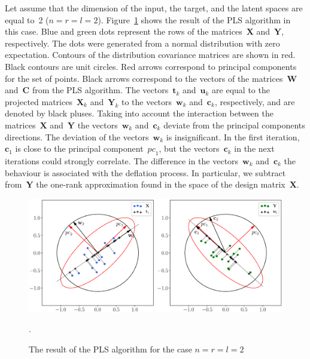 \documentclass[12pt,oneside]{article}
\theoremstyle{definition}
\newcommand{\bw}{\mathbf{w}}
\newcommand{\bY}{\mathbf{Y}}
\newcommand{\bX}{\mathbf{X}}
\newcommand{\bu}{\mathbf{u}}
\newcommand{\bt}{\mathbf{t}}
\newcommand{\bc}{\mathbf{c}}
\newcommand{\bC}{\mathbf{C}}
\newcommand{\bW}{\mathbf{W}}
\begin{document}
Let assume that the dimension of the input, the target, and the latent spaces are equal to~2 ($n = r = l = 2$).
Figure~\ref{fig:PLSFigure} shows the result of the PLS algorithm in this case.
Blue and green dots represent the rows of the matrices~$\bX$ and~$\bY$, respectively. 
The dots were generated from a normal distribution with zero expectation. 
Contours of the distribution covariance matrices are shown in red.
Black contours are unit circles. 
Red arrows correspond to principal components for the set of points. 
Black arrows correspond to the vectors of the matrices~$\bW$ and~$\bC$ from the PLS algorithm. 
The vectors~$\bt_k$ and~$\bu_k$ are equal to the projected matrices~$\bX_k$ and~$\bY_k$ to the vectors~$\bw_k$ and~$\bc_k$, respectively, and are denoted by black pluses. 
Taking into account the interaction between the matrices~$\bX$ and~$\bY$ the vectors~$\bw_k$ and~$\bc_k$ deviate from the principal components directions. 
The deviation of the vectors~$\bw_k$ is insignificant. 
In the first iteration, $\bc_1$ is close to the principal component~$\textit{pc}_1$, but the vectors~$\bc_k$ in the next iterations could strongly correlate. 
The difference in the vectors~$\bw_k$ and~$\bc_k$ the behaviour is associated with the deflation process. In particular, we subtract from~$\bY$ the one-rank approximation found in the space of the design matrix~$\bX$.
\begin{figure}[h]
	\centering
	\includegraphics[width=\linewidth]{figs/PLSFigure.eps}
	\caption{The result of the PLS algorithm for the case $n = r = l = 2$}.
	\label{fig:PLSFigure}
\end{figure}
\end{document}
